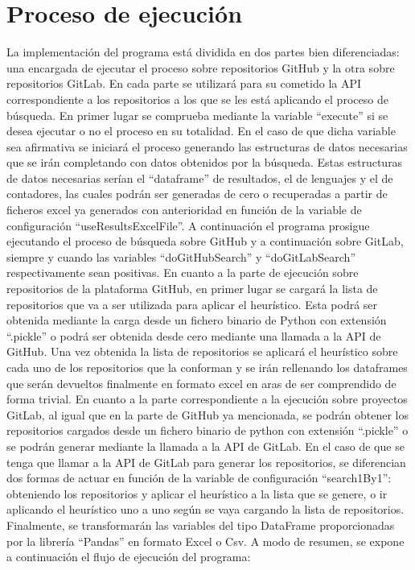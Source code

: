 \section{Proceso de ejecución}
La implementación del programa está dividida en dos partes bien diferenciadas: una encargada de ejecutar el proceso sobre repositorios GitHub y la otra sobre repositorios GitLab. En cada parte se utilizará para su cometido la API correspondiente a los repositorios a los que se les está aplicando el proceso de búsqueda.
En primer lugar se comprueba mediante la variable ``execute'' si se desea ejecutar o no el proceso en su totalidad. En el caso de que dicha variable sea afirmativa se iniciará el proceso generando las estructuras de datos necesarias que se irán completando con datos obtenidos por la búsqueda. 
Estas estructuras de datos necesarias serían el ``dataframe'' de resultados, el de lenguajes y el de contadores, las cuales podrán ser generadas de cero o recuperadas a partir de ficheros excel ya generados con anterioridad en función de la variable de configuración ``useResultsExcelFile''.
A continuación el programa prosigue ejecutando el proceso de búsqueda sobre GitHub y a continuación sobre GitLab, siempre y cuando las variables ``doGitHubSearch'' y ``doGitLabSearch'' respectivamente sean positivas.
En cuanto a la parte de ejecución sobre repositorios de la plataforma GitHub, en primer lugar se cargará la lista de repositorios que va a ser utilizada para aplicar el heurístico. Esta podrá ser obtenida mediante la carga desde un fichero binario de Python con extensión ``.pickle'' o podrá ser obtenida desde cero mediante una llamada a la API de GitHub.
Una vez obtenida la lista de repositorios se aplicará el heurístico sobre cada uno de los repositorios que la conforman y se irán rellenando los dataframes que serán devueltos finalmente en formato excel en aras de ser comprendido de forma trivial.
En cuanto a la parte correspondiente a la ejecución sobre proyectos GitLab, al igual que en la parte de GitHub ya mencionada, se podrán obtener los repositorios cargados desde un fichero binario de python con extensión ``.pickle'' o se podrán generar mediante la llamada a la API de GitLab. En el caso de que se tenga que llamar a la API de GitLab para generar los repositorios, se diferencian dos formas de actuar en función de la variable de configuración ``search1By1'': obteniendo los repositorios y aplicar el heurístico a la lista que se genere, o ir aplicando el heurístico uno a uno según se vaya cargando la lista de repositorios.
Finalmente, se transformarán las variables del tipo DataFrame proporcionadas por la librería ``Pandas'' en formato Excel o Csv.
A modo de resumen, se expone a continuación el flujo de ejecución del programa:

